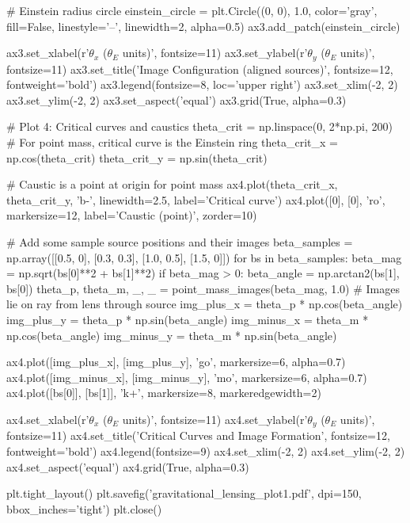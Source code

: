 \documentclass[11pt,a4paper]{article}
\begin{document}
\begin{pycode}
# Einstein radius circle
einstein_circle = plt.Circle((0, 0), 1.0, color='gray', fill=False,
                            linestyle='--', linewidth=2, alpha=0.5)
ax3.add_patch(einstein_circle)

ax3.set_xlabel(r'$\theta_x$ ($\theta_E$ units)', fontsize=11)
ax3.set_ylabel(r'$\theta_y$ ($\theta_E$ units)', fontsize=11)
ax3.set_title('Image Configuration (aligned sources)', fontsize=12, fontweight='bold')
ax3.legend(fontsize=8, loc='upper right')
ax3.set_xlim(-2, 2)
ax3.set_ylim(-2, 2)
ax3.set_aspect('equal')
ax3.grid(True, alpha=0.3)

# Plot 4: Critical curves and caustics
theta_crit = np.linspace(0, 2*np.pi, 200)
# For point mass, critical curve is the Einstein ring
theta_crit_x = np.cos(theta_crit)
theta_crit_y = np.sin(theta_crit)

# Caustic is a point at origin for point mass
ax4.plot(theta_crit_x, theta_crit_y, 'b-', linewidth=2.5, label='Critical curve')
ax4.plot([0], [0], 'ro', markersize=12, label='Caustic (point)', zorder=10)

# Add some sample source positions and their images
beta_samples = np.array([[0.5, 0], [0.3, 0.3], [1.0, 0.5], [1.5, 0]])
for bs in beta_samples:
    beta_mag = np.sqrt(bs[0]**2 + bs[1]**2)
    if beta_mag > 0:
        beta_angle = np.arctan2(bs[1], bs[0])
        theta_p, theta_m, _, _ = point_mass_images(beta_mag, 1.0)
        # Images lie on ray from lens through source
        img_plus_x = theta_p * np.cos(beta_angle)
        img_plus_y = theta_p * np.sin(beta_angle)
        img_minus_x = theta_m * np.cos(beta_angle)
        img_minus_y = theta_m * np.sin(beta_angle)

        ax4.plot([img_plus_x], [img_plus_y], 'go', markersize=6, alpha=0.7)
        ax4.plot([img_minus_x], [img_minus_y], 'mo', markersize=6, alpha=0.7)
        ax4.plot([bs[0]], [bs[1]], 'k+', markersize=8, markeredgewidth=2)

ax4.set_xlabel(r'$\theta_x$ ($\theta_E$ units)', fontsize=11)
ax4.set_ylabel(r'$\theta_y$ ($\theta_E$ units)', fontsize=11)
ax4.set_title('Critical Curves and Image Formation', fontsize=12, fontweight='bold')
ax4.legend(fontsize=9)
ax4.set_xlim(-2, 2)
ax4.set_ylim(-2, 2)
ax4.set_aspect('equal')
ax4.grid(True, alpha=0.3)

plt.tight_layout()
plt.savefig('gravitational_lensing_plot1.pdf', dpi=150, bbox_inches='tight')
plt.close()
\end{pycode}
\end{document}

